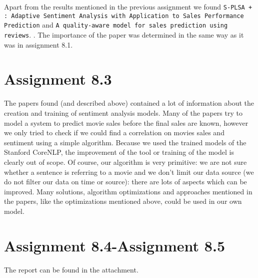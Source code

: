 \documentclass[]{article}
\begin{document}
Apart from the results mentioned in the previous assignment we found \texttt{S-PLSA + : Adaptive Sentiment Analysis with Application to Sales Performance Prediction}\cite{Liu} and \texttt{A quality-aware model for sales prediction using reviews}. \cite{Yu2010}. The importance of the paper was determined in the same way as it was in assignment 8.1.

\section*{Assignment 8.3}
The papers found (and described above) contained a lot of information about the creation and training of sentiment analysis models. Many of the papers try to model a system to predict movie sales before the final sales are known, however we only tried to check if we could find a correlation on movies sales and sentiment using a simple algorithm. Because we used the trained models of the Stanford CoreNLP, the improvement of the tool or training of the model is clearly out of scope. Of course, our algorithm is very primitive: we are not sure whether a sentence is referring to a movie and we don't limit our data source (we do not filter our data on time or source): there are lots of aspects which can be improved. Many solutions, algorithm optimizations and approaches mentioned in the papers, like the optimizations mentioned above, could be used in our own model.

\section*{Assignment 8.4-Assignment 8.5}
The report can be found in the attachment.





\end{document}
